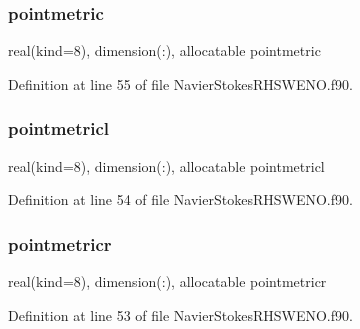 \subsubsection{\texorpdfstring{pointmetric}{pointmetric}}
{\footnotesize\ttfamily real(kind=8), dimension(\+:), allocatable pointmetric}



Definition at line 55 of file Navier\+Stokes\+R\+H\+S\+W\+E\+N\+O.\+f90.

\hypertarget{structnavierstokesrhsweno_1_1dissipation__local_a7f1e3c3f595690164cb8bbf7bbd41b80}{}\label{structnavierstokesrhsweno_1_1dissipation__local_a7f1e3c3f595690164cb8bbf7bbd41b80} 
\subsubsection{\texorpdfstring{pointmetricl}{pointmetricl}}
{\footnotesize\ttfamily real(kind=8), dimension(\+:), allocatable pointmetricl}



Definition at line 54 of file Navier\+Stokes\+R\+H\+S\+W\+E\+N\+O.\+f90.

\hypertarget{structnavierstokesrhsweno_1_1dissipation__local_abea8ce75d2b4007920da3c75b5bc70d4}{}\label{structnavierstokesrhsweno_1_1dissipation__local_abea8ce75d2b4007920da3c75b5bc70d4} 
\subsubsection{\texorpdfstring{pointmetricr}{pointmetricr}}
{\footnotesize\ttfamily real(kind=8), dimension(\+:), allocatable pointmetricr}



Definition at line 53 of file Navier\+Stokes\+R\+H\+S\+W\+E\+N\+O.\+f90.

\hypertarget{structnavierstokesrhsweno_1_1dissipation__local_af7fa31bb1e449e84da7f1aee46de5493}{}\label{structnavierstokesrhsweno_1_1dissipation__local_af7fa31bb1e449e84da7f1aee46de5493} 
